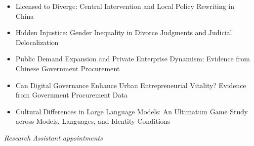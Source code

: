 \documentclass[a4paper,10pt]{article}
\begin{document}
\begin{itemize}

\item Licensed to Diverge: Central Intervention and Local Policy Rewriting in China\\

\item Hidden Injustice: Gender Inequality in Divorce Judgments and Judicial Delocalization\\

\item Public Demand Expansion and Private Enterprise Dynamism: Evidence from Chinese Government Procurement\\

\item Can Digital Governance Enhance Urban Entrepreneurial Vitality? Evidence from Government Procurement Data\\

\item Cultural Differences in Large Language Models: An Ultimatum Game Study across Models, Languages, and Identity Conditions\\

\end{itemize}

\clearpage


\noindent\textit{Research Assistant appointments}
\end{document}

